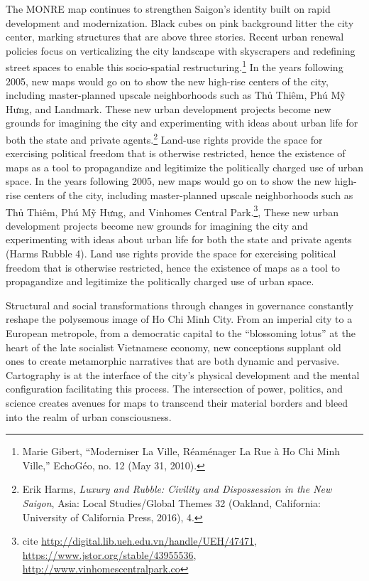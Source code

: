 The MONRE map continues to strengthen Saigon’s identity built on rapid development and modernization. Black cubes on pink background litter the city center, marking structures that are above three stories. Recent urban renewal policies focus on verticalizing the city landscape with skyscrapers and redefining street spaces to enable this socio-spatial restructuring.\footnote{Marie Gibert, “Moderniser La Ville, Réaménager La Rue à Ho Chi Minh Ville,” EchoGéo, no. 12 (May 31, 2010).} In the years following 2005, new maps would go on to show the new high-rise centers of the city, including master-planned upscale neighborhoods such as Thủ Thiêm, Phú Mỹ Hưng, and Landmark. These new urban development projects become new grounds for imagining the city and experimenting with ideas about urban life for both the state and private agents.\footnote{Erik Harms, \textit{Luxury and Rubble: Civility and Dispossession in the New Saigon}, Asia: Local Studies/Global Themes 32 (Oakland, California: University of California Press, 2016), 4.} Land-use rights provide the space for exercising political freedom that is otherwise restricted, hence the existence of maps as a tool to propagandize and legitimize the politically charged use of urban space. In the years following 2005, new maps would go on to show the new high-rise centers of the city, including master-planned upscale neighborhoods such as Thủ Thiêm, Phú Mỹ Hưng, and Vinhomes Central Park.\footnote{cite \url{http://digital.lib.ueh.edu.vn/handle/UEH/47471}, \url{https://www.jstor.org/stable/43955536}, \url{http://www.vinhomescentralpark.co}}, These new urban development projects become new grounds for imagining the city and experimenting with ideas about urban life for both the state and private agents (Harms Rubble 4). Land use rights provide the space for exercising political freedom that is otherwise restricted, hence the existence of maps as a tool to propagandize and legitimize the politically charged use of urban space.

Structural and social transformations through changes in governance constantly reshape the polysemous image of Ho Chi Minh City. From an imperial city to a European metropole, from a democratic capital to the “blossoming lotus” at the heart of the late socialist Vietnamese economy, new conceptions supplant old ones to create metamorphic narratives that are both dynamic and pervasive. Cartography is at the interface of the city’s physical development and the mental configuration facilitating this process. The intersection of power, politics, and science creates avenues for maps to transcend their material borders and bleed into the realm of urban consciousness.

